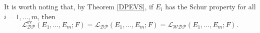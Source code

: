 \documentclass[12 pt]{article}%
\newtheorem{final remark}[theorem]{Final Remark}
\begin{document}
%
%
%

It is worth noting that, by Theorem \ref{DPEVS}, if $E_i$ has the Schur property for all $i=1,\dots,m$, then
\[
\mathcal{L_{DP}^{\mathrm{ev}}}(E_1,\dots,E_m;F)
= \mathcal{L_{DP}}(E_1,\dots,E_m;F)
= \mathcal{L_{WDP}}(E_1,\dots,E_m;F).
\]
\end{document}
